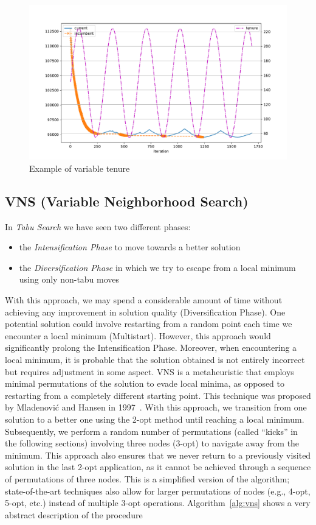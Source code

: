 \documentclass{article}
\begin{document}
\begin{figure}[ht]
        \caption{Example of variable tenure}
        \label{fig:sin_ten}
        \centering
        \includegraphics[width=400pt]{assets/sin_ten.pdf}
\end{figure}

\clearpage

\subsection{VNS (Variable Neighborhood Search)}
In \textit{Tabu Search} we have seen two different phases:
\begin{itemize}
        \item the \textit{Intensification Phase} to move towards a better solution
        \item the \textit{Diversification Phase} in which we try to escape from a local minimum using only
        non-tabu moves
\end{itemize}
With this approach, we may spend a considerable amount of time without achieving any improvement in
solution quality (Diversification Phase). One potential solution could involve restarting from a random
point each time we encounter a local minimum (Multistart). However, this approach would significantly
prolong the Intensification Phase. Moreover, when encountering a local minimum, it is probable
that the solution obtained is not entirely incorrect but requires adjustment in some aspect.
VNS is a metaheuristic that employs minimal permutations of the solution to evade local minima, as
opposed to restarting from a completely different starting point.
This technique was proposed by Mladenovi{\'c} and Hansen in 1997~\cite{mladenovic1997variable}.
With this approach, we transition from one solution to a better one using the 2-opt method until reaching
a local minimum. Subsequently, we perform a random number of permutations (called ``kicks'' in the following sections)
involving three nodes (3-opt) to navigate away from the minimum.
This approach also ensures that we never return to a previously visited
solution in the last 2-opt application, as it cannot be achieved through a sequence of permutations of
three nodes.
This is a simplified version of the algorithm; state-of-the-art techniques also allow for larger permutations
of nodes (e.g., 4-opt, 5-opt, etc.) instead of multiple 3-opt operations.
Algorithm~\ref{alg:vns} shows a very abstract description of the procedure
\end{document}
